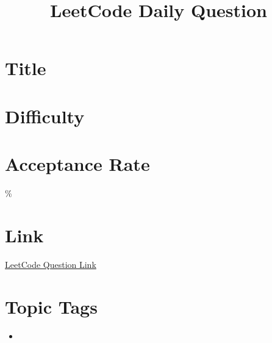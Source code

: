 \documentclass[a4paper,12pt]{article}
\title{LeetCode Daily Question}
\date{\VAR{date}}
\begin{document}
\maketitle

\section*{Title}

\section*{Difficulty}

\section*{Acceptance Rate}
\%

\section*{Link}
\href{https://leetcode.com\VAR{link}}{LeetCode Question Link}

\section*{Topic Tags}
\begin{itemize}
  \item {}
\end{itemize}
\end{document}
